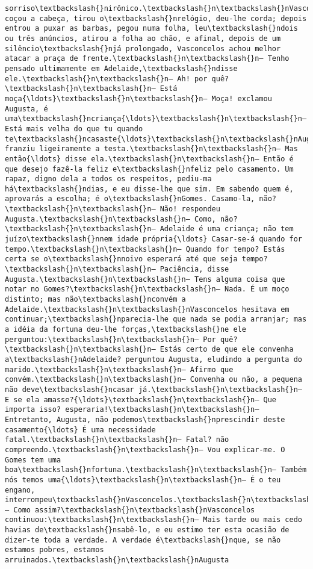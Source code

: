 \documentclass[11pt]{article}
\begin{document}
\begin{Verbatim}[commandchars=\\\{\}]
sorriso\textbackslash{}nirônico.\textbackslash{}n\textbackslash{}nVasconcelos coçou a cabeça, tirou o\textbackslash{}nrelógio, deu-lhe corda; depois entrou a puxar as barbas, pegou numa folha, leu\textbackslash{}ndois ou três anúncios, atirou a folha ao chão, e afinal, depois de um silêncio\textbackslash{}njá prolongado, Vasconcelos achou melhor atacar a praça de frente.\textbackslash{}n\textbackslash{}n— Tenho pensado ultimamente em Adelaide,\textbackslash{}ndisse ele.\textbackslash{}n\textbackslash{}n— Ah! por quê?\textbackslash{}n\textbackslash{}n— Está moça{\ldots}\textbackslash{}n\textbackslash{}n— Moça! exclamou Augusta, é uma\textbackslash{}ncriança{\ldots}\textbackslash{}n\textbackslash{}n— Está mais velha do que tu quando te\textbackslash{}ncasaste{\ldots}\textbackslash{}n\textbackslash{}nAugusta franziu ligeiramente a testa.\textbackslash{}n\textbackslash{}n— Mas então{\ldots} disse ela.\textbackslash{}n\textbackslash{}n— Então é que desejo fazê-la feliz e\textbackslash{}nfeliz pelo casamento. Um rapaz, digno dela a todos os respeitos, pediu-ma há\textbackslash{}ndias, e eu disse-lhe que sim. Em sabendo quem é, aprovarás a escolha; é o\textbackslash{}nGomes. Casamo-la, não?\textbackslash{}n\textbackslash{}n— Não! respondeu Augusta.\textbackslash{}n\textbackslash{}n— Como, não?\textbackslash{}n\textbackslash{}n— Adelaide é uma criança; não tem juízo\textbackslash{}nnem idade própria{\ldots} Casar-se-á quando for tempo.\textbackslash{}n\textbackslash{}n— Quando for tempo? Estás certa se o\textbackslash{}nnoivo esperará até que seja tempo?\textbackslash{}n\textbackslash{}n— Paciência, disse Augusta.\textbackslash{}n\textbackslash{}n— Tens alguma coisa que notar no Gomes?\textbackslash{}n\textbackslash{}n— Nada. É um moço distinto; mas não\textbackslash{}nconvém a Adelaide.\textbackslash{}n\textbackslash{}nVasconcelos hesitava em continuar;\textbackslash{}nparecia-lhe que nada se podia arranjar; mas a idéia da fortuna deu-lhe forças,\textbackslash{}ne ele perguntou:\textbackslash{}n\textbackslash{}n— Por quê?\textbackslash{}n\textbackslash{}n— Estás certo de que ele convenha a\textbackslash{}nAdelaide? perguntou Augusta, eludindo a pergunta do marido.\textbackslash{}n\textbackslash{}n— Afirmo que convém.\textbackslash{}n\textbackslash{}n— Convenha ou não, a pequena não deve\textbackslash{}ncasar já.\textbackslash{}n\textbackslash{}n— E se ela amasse?{\ldots}\textbackslash{}n\textbackslash{}n— Que importa isso? esperaria!\textbackslash{}n\textbackslash{}n— Entretanto, Augusta, não podemos\textbackslash{}nprescindir deste casamento{\ldots} É uma necessidade fatal.\textbackslash{}n\textbackslash{}n— Fatal? não compreendo.\textbackslash{}n\textbackslash{}n— Vou explicar-me. O Gomes tem uma boa\textbackslash{}nfortuna.\textbackslash{}n\textbackslash{}n— Também nós temos uma{\ldots}\textbackslash{}n\textbackslash{}n— É o teu engano, interrompeu\textbackslash{}nVasconcelos.\textbackslash{}n\textbackslash{}n— Como assim?\textbackslash{}n\textbackslash{}nVasconcelos continuou:\textbackslash{}n\textbackslash{}n— Mais tarde ou mais cedo havias de\textbackslash{}nsabê-lo, e eu estimo ter esta ocasião de dizer-te toda a verdade. A verdade é\textbackslash{}nque, se não estamos pobres, estamos arruinados.\textbackslash{}n\textbackslash{}nAugusta 
\end{Verbatim}
\end{document}
